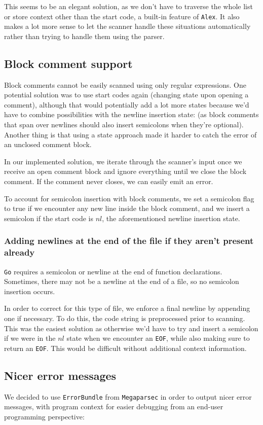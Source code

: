 \documentclass[11pt]{article}
\begin{document}
This seems to be an elegant solution, as we don't have to traverse
the whole list or store context other than the start code, a
built-in feature of \texttt{Alex}. It also makes a lot more sense to let
the scanner handle these situations automatically rather than trying
to handle them using the parser.
\subsection{Block comment support}
\label{sec:orge7c44bf}
Block comments cannot be easily scanned using only regular
expressions. One potential solution was to use start codes again
(changing state upon opening a comment), although that would
potentially add a lot more states because we'd have to combine
possibilities with the newline insertion state: (as block
comments that span over newlines should also insert semicolons when
they're optional). Another thing is that using a state approach
made it harder to catch the error of an unclosed comment block.

In our implemented solution, we iterate through the scanner's input
once we receive an open comment block and ignore everything until we
close the block comment. If the comment never closes, we can easily
emit an error.

To account for semicolon insertion with block comments, we set a
semicolon flag to true if we encounter any new line inside the
block comment, and we insert a semicolon if the start code is
\(nl\), the aforementioned newline insertion state.
\subsubsection{Adding newlines at the end of the file if they aren't present already}
\label{sec:orgf002d2d}
\texttt{Go} requires a semicolon or newline at the end of function
declarations. Sometimes, there may not be a newline at the end of
a file, so no semicolon insertion occurs.

In order to correct for this type of file, we enforce a final
newline by appending one if necessary. To do this, the code string
is preprocessed prior to scanning. This was the easiest solution
as otherwise we'd have to try and insert a semicolon if we were in
the \(nl\) state when we encounter an \texttt{EOF}, while also making sure
to return an \texttt{EOF}. This would be difficult without additional
context information.
\subsection{Nicer error messages}
\label{sec:orgce3b2bd}
We decided to use \texttt{ErrorBundle} from \texttt{Megaparsec} in order to
output nicer error messages, with program context for easier
debugging from an end-user programming perspective:
\end{document}
